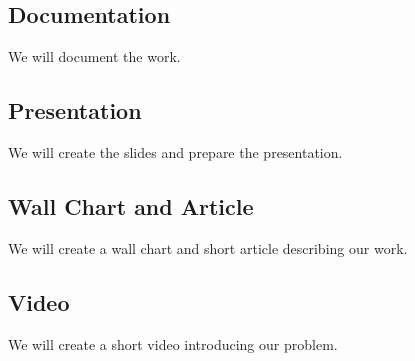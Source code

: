 \subsection{Documentation}\label{subsec:source-code-documentation}
We will document the work.

\subsection{Presentation}\label{subsec:presentation}
We will create the slides and prepare the presentation.

\subsection{Wall Chart and Article}\label{subsec:wall-chart-and-article}
We will create a wall chart and short article describing our work.

\subsection{Video}\label{subsec:video}
We will create a short video introducing our problem.
